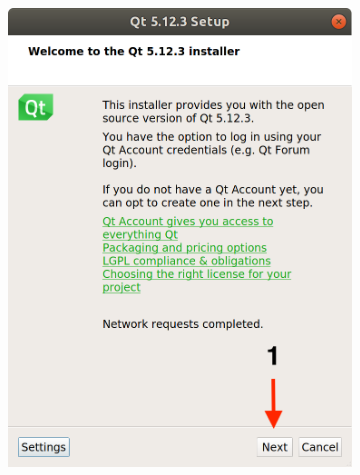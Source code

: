 \begin{figure}[H]
    \centering
    \begin{subfigure}{0.32\linewidth}
        \includegraphics[width=1\textwidth]{Images/Qt1.png}
    \end{subfigure}
    \begin{subfigure}{0.32\linewidth}

\end{subfigure}
\end{figure}
